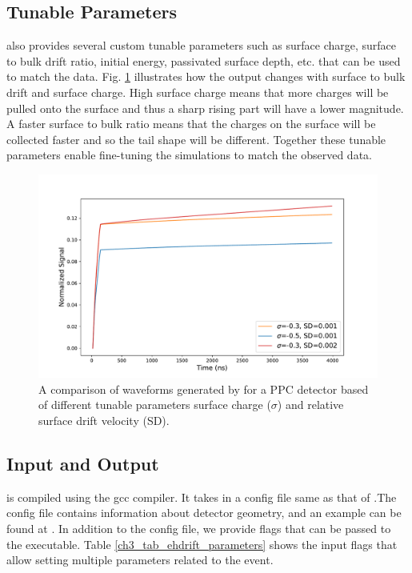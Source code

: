 \subsection{Tunable Parameters}
{\ehd} also provides several custom tunable parameters such as surface charge, surface to bulk drift ratio, initial energy, passivated surface depth, etc. that can be used to match the data. Fig. \ref{fig:wf_comp} illustrates how the output changes with surface to bulk drift and surface charge. High surface charge means that more charges will be pulled onto the surface and thus a sharp rising part will have a lower magnitude. A faster surface to bulk ratio means that the charges on the surface will be collected faster and so the tail shape will be different. Together these tunable parameters enable fine-tuning the simulations to match the observed data.

\begin{figure}%
    \includegraphics[trim={0.1cm 0.3cm 1.3cm 0.3cm},clip,width=0.99\linewidth]{ch3/figs/wf_comp.pdf}
    \caption{A comparison of waveforms generated by {\ehd} for a {\Ltwo} PPC detector based of different tunable parameters surface charge ($\sigma$) and relative surface drift velocity (SD).}
    \label{fig:wf_comp}
\end{figure}


\subsection{Input and Output}
{\ehd} is compiled using the gcc compiler. It takes in a config file same as that of {\siggen}.The config file contains information about detector geometry, and an example can be found at \cite{ehdrift2024}. In addition to the config file, we provide flags that can be passed to the executable. Table \ref{ch3_tab_ehdrift_parameters} shows the input flags that allow setting multiple parameters related to the event.



